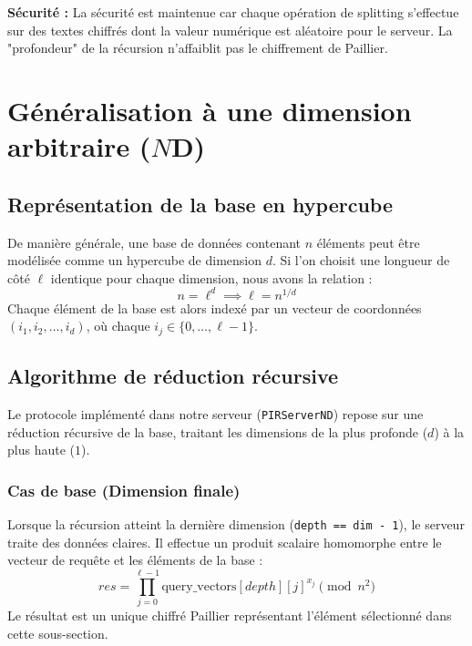 \documentclass[12pt,a4paper]{report}
\begin{document}
\textbf{Sécurité :} La sécurité est maintenue car chaque opération de splitting s'effectue sur des textes chiffrés dont la valeur numérique est aléatoire pour le serveur. La "profondeur" de la récursion n'affaiblit pas le chiffrement de Paillier.

\section{Généralisation à une dimension arbitraire ($N$D)}

\subsection{Représentation de la base en hypercube}
De manière générale, une base de données contenant $n$ éléments peut être modélisée comme un hypercube de dimension $d$. Si l'on choisit une longueur de côté $\ell$ identique pour chaque dimension, nous avons la relation :
\[ n = \ell^d \implies \ell = n^{1/d} \]
Chaque élément de la base est alors indexé par un vecteur de coordonnées $(i_1, i_2, \dots, i_d)$, où chaque $i_j \in \{0, \dots, \ell-1\}$.

\subsection{Algorithme de réduction récursive}
Le protocole implémenté dans notre serveur (\texttt{PIRServerND}) repose sur une réduction récursive de la base, traitant les dimensions de la plus profonde ($d$) à la plus haute ($1$).

\subsubsection{Cas de base (Dimension finale)}
Lorsque la récursion atteint la dernière dimension (\texttt{depth == dim - 1}), le serveur traite des données claires. Il effectue un produit scalaire homomorphe entre le vecteur de requête et les éléments de la base :
\[ res = \prod_{j=0}^{\ell-1} \text{query\_vectors}[depth][j]^{x_j} \pmod{n^2} \]
Le résultat est un unique chiffré Paillier représentant l'élément sélectionné dans cette sous-section.
\end{document}
